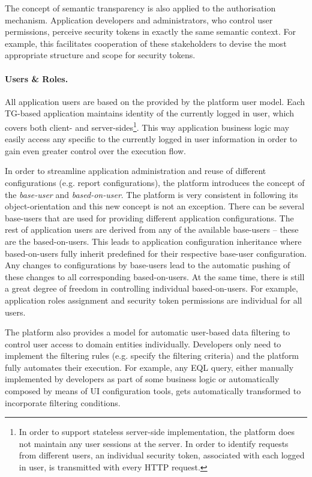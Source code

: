   The concept of semantic transparency is also applied to the authorisation mechanism.
  Application developers and administrators, who control user permissions, perceive security tokens in exactly the same semantic context.
  For example, this facilitates cooperation of these stakeholders to devise the most appropriate structure and scope for security tokens.

  \paragraph{Users \& Roles.} 
  All application users are based on the provided by the platform user model.
  Each TG-based application maintains identity of the currently logged in user, which covers both client- and server-sides\footnote{
    In order to support stateless server-side implementation, the platform does not maintain any user sessions at the server. 
    In order to identify requests from different users, an individual security token, associated with each logged in user, is transmitted with every HTTP request.}.
  This way application business logic may easily access any specific to the currently logged in user information in order to gain even greater control over the  execution flow.
  
  In order to streamline application administration and reuse of different configurations (e.g. report configurations), the platform introduces the concept of the \emph{base-user} and \emph{based-on-user}.
  The platform is very consistent in following its object-orientation and this new concept is not an exception.
  There can be several base-users that are used for providing different application configurations.
  The rest of application users are derived from any of the available base-users -- these are the based-on-users.
  This leads to application configuration inheritance where based-on-users fully inherit predefined for their respective base-user configuration.
  Any changes to configurations by base-users lead to the automatic pushing of these changes to all corresponding based-on-users.
  At the same time, there is still a great degree of freedom in controlling individual based-on-users.
  For example, application roles assignment and security token permissions are individual for all users.
  
  The platform also provides a model for automatic user-based data filtering to control user access to domain entities individually.
  Developers only need to implement the filtering rules (e.g. specify the filtering criteria) and the platform fully automates their execution.
  For example, any EQL query, either manually implemented by developers as part of some business logic or automatically composed by means of UI configuration tools, gets automatically transformed to incorporate filtering conditions.


